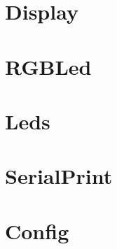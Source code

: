 \begin{appendices}
\newpage

\section{Display}
\label{appendix:Display}

\newpage


\newpage

\section{RGBLed}
\label{appendix:RGBLed}

\newpage


\newpage

\section{Leds}
\label{appendix:Leds}


\newpage




\newpage





\newpage

\section{SerialPrint}
\label{appendix:SerialPrint}

\newpage


\newpage

\section{Config}
\label{appendix:Config}

\end{appendices}
